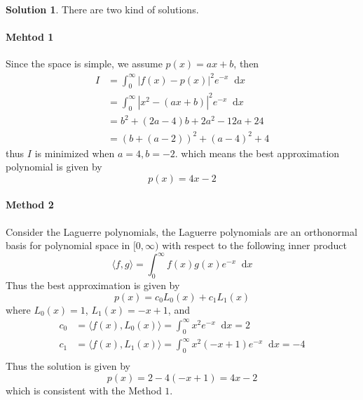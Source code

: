 \documentclass{article}
\newcommand*\diff{\mathop{}\!\mathrm{d}}
\theoremstyle{definition}
\newtheorem{solution}{Solution}
\begin{document}
\begin{solution}
There are two kind of solutions. 
\paragraph{Mehtod 1} Since the space is simple, we assume $p(x)=ax+b$, then
\begin{align*}
I&=\int_{0}^\infty|f(x)-p(x)|^2e^{-x}\diff x\\
&=\int_{0}^\infty|x^2-(ax+b)|^2e^{-x}\diff x\\
&=b^2+(2a-4)b+2a^2-12a+24\\
&=\left(b+(a-2)\right)^2+(a-4)^2+4
\end{align*}
thus $I$ is minimized when $a=4,b=-2$. which means the best approximation polynomial is given by
\begin{equation}
  p(x)=4x-2
\end{equation}

\paragraph{Method 2} Consider the Laguerre polynomials, the Laguerre polynomials are an orthonormal basis for polynomial space in $[0,\infty)$ with respect to the following inner product
\begin{equation}
  \langle f,g\rangle=\int_{0}^{\infty}f(x)g(x)e^{-x}\diff x
\end{equation}
Thus the best approximation is given by
\begin{equation}
  p(x)=c_0L_0(x)+c_1L_1(x)
\end{equation}
where $L_0(x)=1$, $L_1(x)=-x+1$, and
\begin{align*}
c_0&=\langle f(x),L_0(x)\rangle=\int_{0}^{\infty}x^2e^{-x}\diff x=2\\
c_1&=\langle f(x),L_1(x)\rangle=\int_{0}^{\infty}x^2(-x+1)e^{-x}\diff x=-4\\
\end{align*}
Thus the solution is given by
\begin{equation}
  p(x)=2-4(-x+1)=4x-2
\end{equation}
which is consistent with the Method $1$.



\end{solution}
\end{document}
